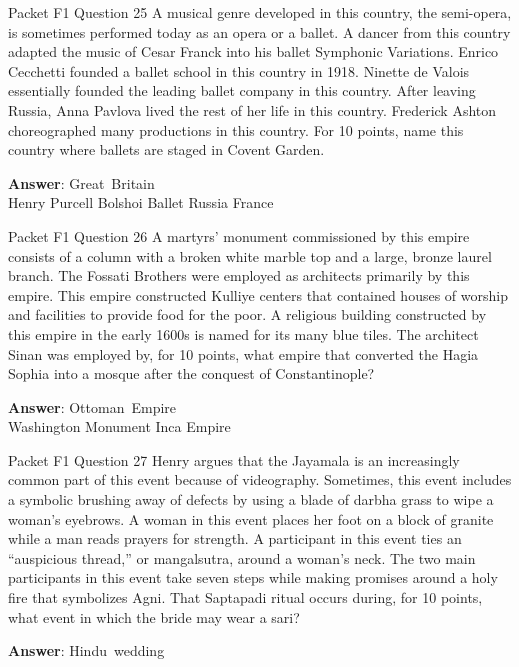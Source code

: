 \begin{frame}{Packet F1 Question 25}
A musical genre developed in this country, the semi-opera, is sometimes performed today as an opera or   a ballet. A dancer from this country adapted the music of Cesar Franck into his ballet Symphonic Variations. Enrico Cecchetti founded a ballet school in this country in 1918. Ninette de Valois essentially founded the leading ballet company in this country. After   leaving Russia, Anna Pavlova lived the rest of her life in this country. Frederick Ashton choreographed many productions in this country. For 10 points, name this country where ballets are staged in Covent Garden.    

\textbf{Answer}: Great\ Britain\\
 Henry Purcell
 Bolshoi Ballet
 Russia
 France
\end{frame}

\begin{frame}{Packet F1 Question 26}
A martyrs’ monument commissioned   by this empire consists of a   column with a broken white marble top and a large, bronze laurel branch. The Fossati Brothers were employed as architects primarily by this   empire. This empire constructed Kulliye   centers that contained houses of worship and facilities to provide food for the poor. A religious building constructed by this empire in the early 1600s is named for its many blue tiles. The architect Sinan was employed by, for 10 points, what empire that converted the Hagia Sophia into a mosque after the conquest of Constantinople?

\textbf{Answer}: Ottoman\ Empire\\
 Washington Monument
 Inca Empire
\end{frame}

\begin{frame}{Packet F1 Question 27}
Henry argues that the Jayamala is an increasingly common part of this event because of videography. Sometimes, this event includes a symbolic brushing away of defects by using a blade of darbha grass to wipe a woman’s eyebrows. A woman in this event places her foot on a block of granite while a man reads prayers for strength. A participant in this event ties an “auspicious thread,” or mangalsutra, around a woman’s neck. The two main participants in this event take seven steps while making promises around a holy fire that symbolizes Agni.     That Saptapadi ritual     occurs during, for 10 points, what event in which the bride may wear a sari?

\textbf{Answer}: Hindu\ wedding\\
\end{frame}

